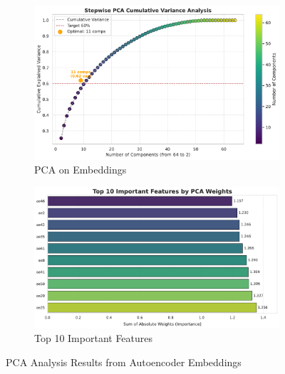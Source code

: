 \documentclass[11pt,letterpaper]{article}
\begin{document}
\begin{figure}[H]
    \centering
    \begin{subfigure}[b]{0.48\textwidth}
        \centering
        \includegraphics[width=\textwidth]{figs/fe4.pdf}
        \caption{PCA on Embeddings}
        \label{fig:fe4}
    \end{subfigure}
    \begin{subfigure}[b]{0.48\textwidth}
        \centering
        \includegraphics[width=\textwidth]{figs/fe5.pdf}
        \caption{Top 10 Important Features}
        \label{fig:fe5}
    \end{subfigure}
    \caption{PCA Analysis Results from Autoencoder Embeddings}
    \label{fig:PCA Analysis}
\end{figure}

\end{document}
